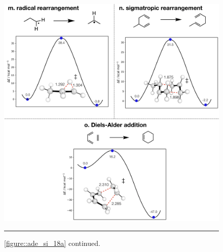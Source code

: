 \documentclass[../../main.tex]{subfiles}
\begin{document}
\begin{figure}[h!]
	\vspace{0.4cm}
	\centering
	\includegraphics[width=\textwidth]{5/autode/figs/figS18m-o}
	\vspace{0.2cm}
	\hrule
	\caption{\figurename{ \ref{figure::ade_si_18a}} continued.}
	\label{fig::ade_si_18m}
\end{figure}
\end{document}
